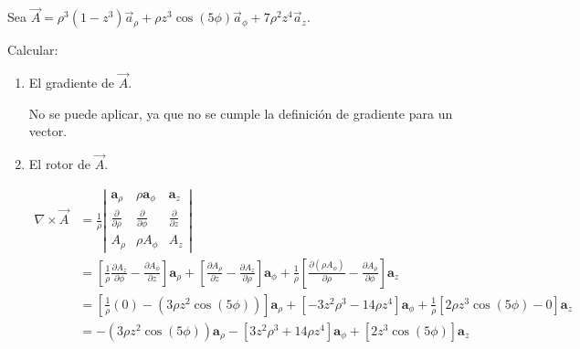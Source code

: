 \begin{problema}
    Sea $\vec{A}=\rho^3\left(1-z^3\right) \vec{a}_\rho+\rho z^3 \cos (5 \phi) \vec{a}_\phi+7 \rho^2 z^4 \vec{a}_z$.
    
    Calcular:
    \begin{enumerate}
        \item El gradiente de $\vec{A}$.
        \begin{sol}
            No se puede aplicar, ya que no se cumple la definición de gradiente para un vector. 
        \end{sol}
        \item El rotor de $\vec{A}$.
        \begin{sol}
        
\begin{align*}
\nabla \times \vec{A} &=\frac{1}{\rho}\left|\begin{array}{ccc}
    \mathbf{a}_\rho & \rho \mathbf{a}_\phi & \mathbf{a}_z \\
    \frac{\partial}{\partial \rho} & \frac{\partial}{\partial \phi} & \frac{\partial}{\partial z} \\
    A_\rho & \rho A_\phi & A_z
    \end{array}\right|\\
&= {\left[\frac{1}{\rho} \frac{\partial A_z}{\partial \phi}-\frac{\partial A_\phi}{\partial z}\right] \mathbf{a}_\rho+\left[\frac{\partial A_\rho}{\partial z}-\frac{\partial A_z}{\partial \rho}\right] \mathbf{a}_\phi}+\frac{1}{\rho}\left[\frac{\partial\left(\rho A_\phi\right)}{\partial \rho}-\frac{\partial A_\rho}{\partial \phi}\right] \mathbf{a}_z\\
&= {\left[\frac{1}{\rho} \left(0\right)-\left(3\rho z^2 \cos (5 \phi)\right)\right] \mathbf{a}_\rho+
\left[-3z^2\rho^3-14\rho z^4\right] \mathbf{a}_\phi}
+\frac{1}{\rho}\left[2\rho z^3\cos(5\phi)-0\right] \mathbf{a}_z\\
&= {-\left(3\rho z^2 \cos (5 \phi)\right) \mathbf{a}_\rho-
\left[3z^2\rho^3+14\rho z^4\right] \mathbf{a}_\phi}
+\left[2 z^3\cos(5\phi)\right] \mathbf{a}_z\\
\end{align*}
        \end{sol}
    \end{enumerate}
\end{problema}

